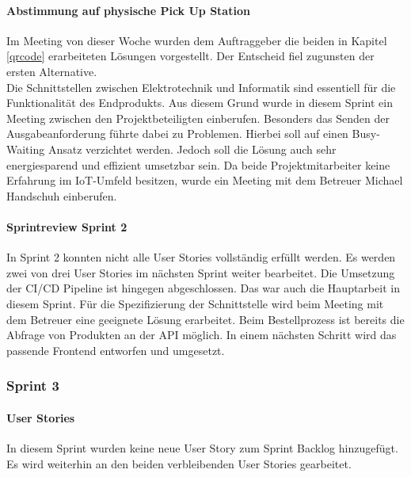 \paragraph{Abstimmung auf physische Pick Up Station}\label{abstimmungPickUp}
Im Meeting von dieser Woche wurden dem Auftraggeber die beiden in Kapitel \ref{qrcode} erarbeiteten Lösungen vorgestellt. Der Entscheid fiel zugunsten der ersten Alternative. \\
Die Schnittstellen zwischen Elektrotechnik und Informatik sind essentiell für die Funktionalität des Endprodukts. Aus diesem Grund wurde in diesem Sprint ein Meeting zwischen den Projektbeteiligten einberufen. Besonders das Senden der Ausgabeanforderung führte dabei zu Problemen. Hierbei soll auf einen Busy-Waiting Ansatz verzichtet werden. Jedoch soll die Lösung auch sehr energiesparend und effizient umsetzbar sein. Da beide Projektmitarbeiter keine Erfahrung im \ac{IoT}-Umfeld besitzen, wurde ein Meeting mit dem Betreuer Michael Handschuh einberufen. 

\paragraph{Sprintreview Sprint 2}
In Sprint 2 konnten nicht alle User Stories vollständig erfüllt werden. Es werden zwei von drei User Stories im nächsten Sprint weiter bearbeitet. Die Umsetzung der CI/CD Pipeline ist hingegen abgeschlossen. Das war auch die Hauptarbeit in diesem Sprint. Für die Spezifizierung der Schnittstelle wird beim Meeting mit dem Betreuer eine geeignete Lösung erarbeitet. Beim Bestellprozess ist bereits die Abfrage von Produkten an der API möglich. In einem nächsten Schritt wird das passende Frontend entworfen und umgesetzt. 
\newpage
\subsubsection{Sprint 3}
\paragraph{User Stories}
In diesem Sprint wurden keine neue \gls{User Story} zum Sprint Backlog hinzugefügt. Es wird weiterhin an den beiden verbleibenden User Stories gearbeitet. 

